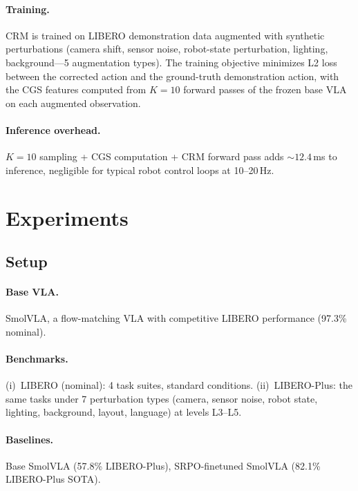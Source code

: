 \documentclass[letterpaper]{article}
\begin{document}
\paragraph{Training.}
CRM is trained on LIBERO demonstration data augmented with synthetic perturbations (camera shift, sensor noise, robot-state perturbation, lighting, background---5 augmentation types).
The training objective minimizes L2 loss between the corrected action and the ground-truth demonstration action, with the CGS features computed from $K{=}10$ forward passes of the frozen base VLA on each augmented observation.

\paragraph{Inference overhead.}
$K{=}10$ sampling + CGS computation + CRM forward pass adds ${\sim}12.4$\,ms to inference, negligible for typical robot control loops at 10--20\,Hz.

\section{Experiments}

\subsection{Setup}

\paragraph{Base VLA.} SmolVLA, a flow-matching VLA with competitive LIBERO performance (97.3\% nominal).

\paragraph{Benchmarks.} (i)~LIBERO (nominal): 4 task suites, standard conditions. (ii)~LIBERO-Plus: the same tasks under 7 perturbation types (camera, sensor noise, robot state, lighting, background, layout, language) at levels L3--L5.

\paragraph{Baselines.} Base SmolVLA (57.8\% LIBERO-Plus), SRPO-finetuned SmolVLA (82.1\% LIBERO-Plus SOTA).
\end{document}
